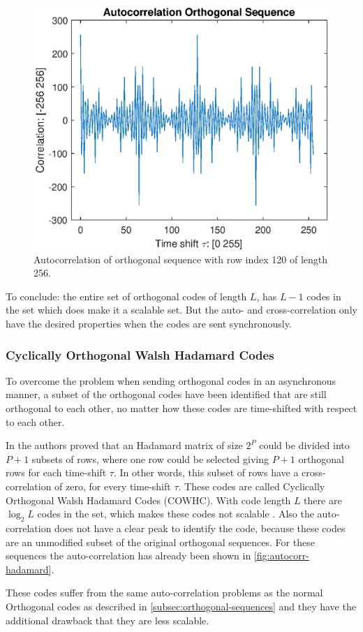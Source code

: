 \begin{figure}[t]
	\centering
	\includegraphics[width=\textwidth]{chapters/cdma-chapters/codes/autocorr-hadamard.eps}
	\caption{Autocorrelation of orthogonal sequence with row index 120 of length 256.}
	\label{fig:autocorr-hadamard}
\end{figure}





To conclude: the entire set of orthogonal codes of length $L$, has $L - 1$ codes in the set which does make it a scalable set.
But the auto- and cross-correlation only have the desired properties when the codes are sent synchronously. 




\subsubsection{Cyclically Orthogonal Walsh Hadamard Codes}

To overcome the problem when sending orthogonal codes in an asynchronous manner, a subset of the orthogonal codes have been identified that are still orthogonal to each other, no matter how these codes are time-shifted with respect to each other.

In \cite{1182447} the authors proved that an Hadamard matrix of size $2^P$ could be divided into $P + 1$ subsets of rows, where one row could be selected giving $P + 1$ orthogonal rows for each time-shift $\tau$.
In other words, this subset of rows have a cross-correlation of zero, for every time-shift $\tau$.
These codes are called Cyclically Orthogonal Walsh Hadamard Codes (COWHC).
With code length $L$ there are $\log_2 L$ codes in the set, which makes these codes not scalable \cite{1182447}. 
Also the auto-correlation does not have a clear peak to identify the code, because these codes are an unmodified subset of the original orthogonal sequences.
For these sequences the auto-correlation has already been shown in \autoref{fig:autocorr-hadamard}.

These codes suffer from the same auto-correlation problems as the normal Orthogonal codes as described in \autoref{subsec:orthogonal-sequences} and they have the additional drawback that they are less scalable.